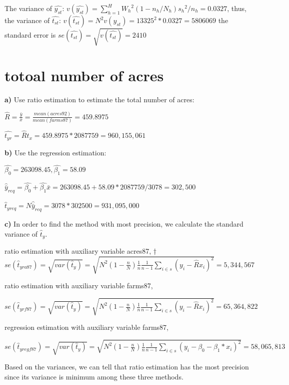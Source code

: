 \documentclass[11pt]{article}
\begin{document}
The variance of $\hat{y_{st}}$: $v(\hat{y_{st}}) = \sum_{h=1}^{H}{W_h}^2(1-n_h/N_h){s_h}^2/n_h = 0.0327$, thus, the variance of $\hat{t_{st}}$: $v(\hat{t_{st}}) = N^2v({y_{st}}) = 13325^2*0.0327 = 5806069$ the standard error is $se(\hat{t_{st}}) = \sqrt{v(\hat{t_{st}})} = 2410$

\section{totoal number of acres}
\textbf{a)}
Use ratio estimation to estimate the total number of acres:

$\hat{R} = \frac{\bar{y}}{\bar{x}} = \frac{mean(acres92)}{mean(farms87)} = 459.8975$

$\hat{t_{yr}} = \hat{R}t_{x} = 459.8975* 2087759 =  960,155,061$

\textbf{b)}
Use the regression estimation:

$\hat{\beta_0} = 263098.45, \hat{\beta_1} = 58.09$

$\hat{\bar{y}}_{req} = \hat{\beta_0} + \hat{\beta_1}\bar{x} =263098.45 +  58.09 * 2087759/3078 =   302,500$

$\hat{t}_{{yreq}} = N\hat{\bar{y}}_{req} =3078 * 302500 = 931,095,000 $

\textbf{c)}
In order to find the method with most precision, we calculate the standard variance of $ \hat{t}_y$.

ratio estimation with auxiliary variable acres87,
†
$ se(\hat{t}_{yra87}) = \sqrt{var(\hat{t}_y)} = \sqrt{N^2(1-\frac{n}{N})\frac{1}{n}\frac{1}{n-1}\sum_{i\in s}^{}{(y_i - \hat{R}x_i)^2}} = 5,344,567$

ratio estimation with auxiliary variable farms87,

$ se(\hat{t}_{yrf87}) = \sqrt{var(\hat{t}_y)} = \sqrt{N^2(1-\frac{n}{N})\frac{1}{n}\frac{1}{n-1}\sum_{i\in s}^{}{(y_i - \hat{R}x_i)^2}} = 65,364,822$

regression estimation with auxiliary variable farms87,

$ se(\hat{t}_{yregf87}) = \sqrt{var(\hat{t}_y)} = \sqrt{N^2(1-\frac{n}{N})\frac{1}{n}\frac{1}{n-1}\sum_{i\in s}^{}{(y_i - \beta_0 - \beta_1*x_i)^2}} = 58,065,813$

Based on the variances, we can tell that ratio estimation has the most precision since its variance is minimum among these three methods.
\end{document}
